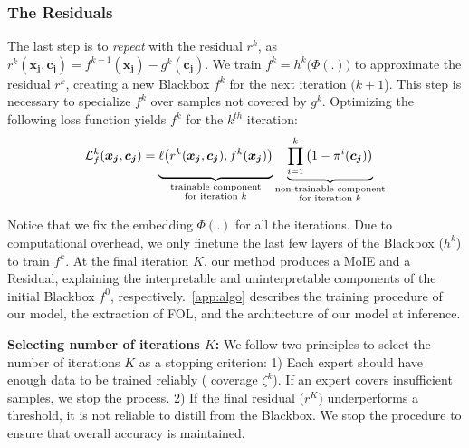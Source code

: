 \subsubsection{The Residuals}
The last step is to \emph{repeat} with the residual $r^k$, as $\displaystyle r^k(\boldsymbol{x_j},\boldsymbol{c_j}) = f^{k - 1}(\boldsymbol{x_j}) - g^k(\boldsymbol{c_j})$.
We train $f^k = h^k\big(\Phi(.)\big)$ to approximate the residual $r^k$, creating a new Blackbox $f^k$ for the next iteration $(k+1$). This step is necessary to specialize $\displaystyle f^k$ over samples not covered by $g^k$. Optimizing the following loss function yields $\displaystyle f^k$ for the $\displaystyle k^{th}$ iteration:
\begin{equation}
\label{equ: residual}
\mathcal{L}_f^k(\boldsymbol{x_j}, \boldsymbol{c_j}) = \underbrace{\mystrut{2.6ex}\ell\big(r^k(\boldsymbol{x_j}, \boldsymbol{c_j}), f^k(\boldsymbol{x_j})\big)}_{\substack{\text{trainable component} \\ \text{for iteration $k$}}} \underbrace{\mystrut{2.6ex}\prod_{i=1} ^{k}\big(1 - \pi^i(\boldsymbol{c_j})\big)}_{\substack{\text{non-trainable component} \\ \text{for iteration $k$}}} 
\end{equation}

Notice that we fix the embedding $\displaystyle \Phi(.)$ for all the iterations. Due to computational overhead, we only finetune the last few layers of the Blackbox ($h^k$) to train $f^k$.
At the final iteration $K$, our method produces a MoIE and a Residual, explaining the interpretable and uninterpretable components of the initial Blackbox $f^0$, respectively.~\cref{app:algo} describes the training procedure of our model, the extraction of FOL, and the architecture of our model at inference.


\textbf{Selecting number of iterations $K$:} We follow two principles to select the number of iterations $K$ as a stopping criterion: 1) Each expert should have enough data to be trained reliably (
coverage $\zeta^k$). If an expert covers insufficient samples, we stop the process. 2) If the final residual ($r^K$) underperforms a threshold, it is not reliable to distill from the Blackbox. We stop the procedure to ensure that overall accuracy is maintained.